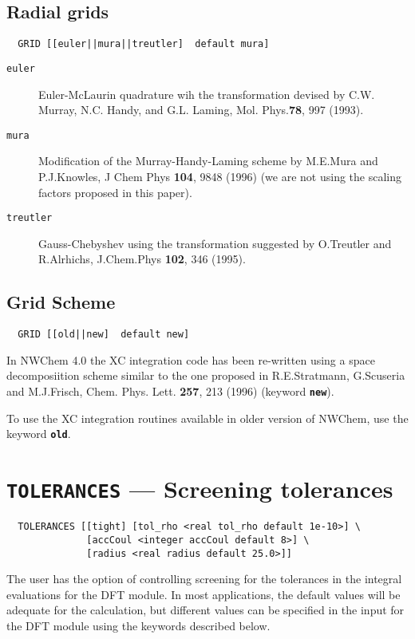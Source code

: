 \subsection{Radial grids}

\begin{verbatim}
  GRID [[euler||mura||treutler]  default mura]
\end{verbatim}

\begin{description}
\item[\tt euler] Euler-McLaurin quadrature wih the transformation
  devised by
C.W. Murray, N.C. Handy, and G.L. Laming,
Mol. Phys.{\bf 78}, 997 (1993).
 \\
\item[\tt mura] Modification of the Murray-Handy-Laming scheme by 
M.E.Mura and P.J.Knowles, J Chem Phys {\bf 104}, 9848
(1996) (we are not using the scaling factors proposed
in this paper).\\
\item[\tt treutler] Gauss-Chebyshev using the transformation suggested
  by O.Treutler and R.Alrhichs, J.Chem.Phys {\bf 102}, 346 (1995).\\
\end{description}

\subsection{Grid Scheme}

\begin{verbatim}
  GRID [[old||new]  default new]
\end{verbatim}

In NWChem 4.0 the XC integration code has been re-written using a
space decomposiition scheme similar to the one proposed in R.E.Stratmann, G.Scuseria and  M.J.Frisch,
Chem. Phys. Lett. {\bf 257}, 213 (1996) (keyword
{\bf \tt new}). 

To use the XC integration routines available in
older version of NWChem, use the keyword {\bf \tt old}.


\section{{\tt TOLERANCES} --- Screening tolerances}

\begin{verbatim}
  TOLERANCES [[tight] [tol_rho <real tol_rho default 1e-10>] \
              [accCoul <integer accCoul default 8>] \
              [radius <real radius default 25.0>]]
\end{verbatim}
%
%
The user has the option of controlling screening for the tolerances in
the integral evaluations for the DFT module.  In most applications,
the default values will be adequate for the calculation, but different
values can be specified in the input for the DFT module using the
keywords described below.

